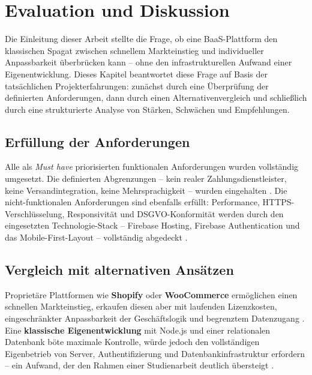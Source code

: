 ﻿%
\chapter{Evaluation und Diskussion}
\label{ch:evaluation}

Die Einleitung dieser Arbeit stellte die Frage, ob eine BaaS-Plattform den klassischen Spagat zwischen schnellem Markteinstieg und individueller Anpassbarkeit überbrücken kann -- ohne den infrastrukturellen Aufwand einer Eigenentwicklung. Dieses Kapitel beantwortet diese Frage auf Basis der tatsächlichen Projekterfahrungen: zunächst durch eine Überprüfung der definierten Anforderungen, dann durch einen Alternativenvergleich und schließlich durch eine strukturierte Analyse von Stärken, Schwächen und Empfehlungen.

\section{Erfüllung der Anforderungen}
\label{sec:anforderungserfuellung}

Alle als \textit{Must have} priorisierten funktionalen Anforderungen wurden vollständig umgesetzt. Die definierten Abgrenzungen -- kein realer Zahlungsdienstleister, keine Versandintegration, keine Mehrsprachigkeit -- wurden eingehalten \cite{heinemann2024}. Die nicht-funktionalen Anforderungen sind ebenfalls erfüllt: Performance, HTTPS-Verschlüsselung, Responsivität und DSGVO-Konformität werden durch den eingesetzten Technologie-Stack -- Firebase Hosting, Firebase Authentication und das Mobile-First-Layout -- vollständig abgedeckt \cite{firebaseAuth2025}.

\section{Vergleich mit alternativen Ansätzen}
\label{sec:alternativvergleich}

Proprietäre Plattformen wie \textbf{Shopify} oder \textbf{WooCommerce} ermöglichen einen schnellen Markteinstieg, erkaufen diesen aber mit laufenden Lizenzkosten, eingeschränkter Anpassbarkeit der Geschäftslogik und begrenztem Datenzugang \cite{bang2023, oosi2023}. Eine \textbf{klassische Eigenentwicklung} mit Node.js und einer relationalen Datenbank böte maximale Kontrolle, würde jedoch den vollständigen Eigenbetrieb von Server, Authentifizierung und Datenbankinfrastruktur erfordern -- ein Aufwand, der den Rahmen einer Studienarbeit deutlich übersteigt \cite{kolesnikov2024}.

